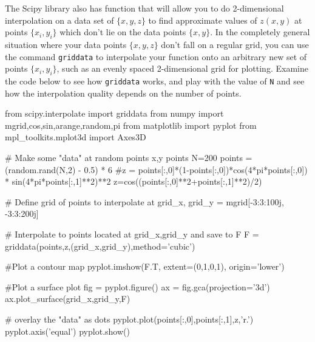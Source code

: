   The Scipy library
also has function that will allow you to do 2-dimensional interpolation on a
data set of $\{x,y,z\}$ to find approximate values of $z(x,y)$ at
points $\{x_i,y_i\}$ which don't lie on the data points $\{x,y\}$.  In
the completely general situation where your data points $\{x,y,z\}$
don't fall on a regular grid, you can use the command {\tt griddata}
to interpolate your function onto an arbitrary new set of points
$\{x_i,y_i\}$, such as an evenly spaced 2-dimensional grid for
plotting. Examine the code below to see how {\tt griddata}
works, and play with the value of {\tt N} and see how the
interpolation quality depends on the number of points.
\begin{codeexample}
\begin{VerbatimOut}{\listingFile}
from scipy.interpolate import griddata
from numpy import mgrid,cos,sin,arange,random,pi
from matplotlib import pyplot
from mpl_toolkits.mplot3d import Axes3D


# Make some "data" at random points x,y points
N=200
points = (random.rand(N,2) - 0.5) * 6
#z = points[:,0]*(1-points[:,0])*cos(4*pi*points[:,0]) *
sin(4*pi*points[:,1]**2)**2
z=cos((points[:,0]**2+points[:,1]**2)/2)

# Define grid of points to interpolate at
grid_x, grid_y = mgrid[-3:3:100j, -3:3:200j]

# Interpolate to points located at grid_x,grid_y and save to F
F = griddata(points,z,(grid_x,grid_y),method='cubic')

#Plot a contour map
pyplot.imshow(F.T, extent=(0,1,0,1), origin='lower')

#Plot a surface plot
fig = pyplot.figure()
ax = fig.gca(projection='3d')
ax.plot_surface(grid_x,grid_y,F)

# overlay the "data" as dots
pyplot.plot(points[:,0],points[:,1],z,'r.')
pyplot.axis('equal')
pyplot.show()
\end{VerbatimOut}
\end{codeexample}


